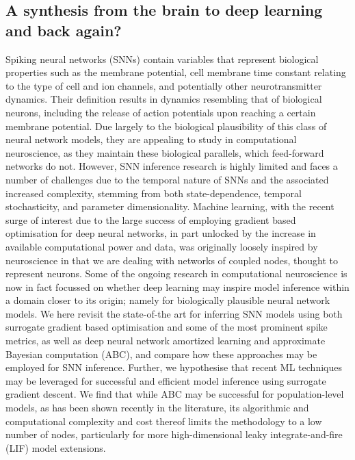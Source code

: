 \documentclass[mphil,deptreport,ai]{infthesis} %
\begin{document}

\subsection{A synthesis from the brain to deep learning and back again?}

Spiking neural networks (SNNs) contain variables that represent biological properties such as the membrane potential, cell membrane time constant relating to the type of cell and ion channels, and potentially other neurotransmitter dynamics. Their definition results in dynamics resembling that of biological neurons, including the release of action potentials upon reaching a certain membrane potential.
Due largely to the biological plausibility of this class of neural network models, they are appealing to study in computational neuroscience, as they maintain these biological parallels, which feed-forward networks  do not.
However, SNN inference research is highly limited and faces a number of challenges due to the temporal nature of SNNs and the associated increased complexity, stemming from both state-dependence, temporal stochasticity, and parameter dimensionality.
Machine learning, with the recent surge of interest due to the large success of employing gradient based optimisation for deep neural networks, in part unlocked by the increase in available computational power and data, was originally loosely inspired by neuroscience in that we are dealing with networks of coupled nodes, thought to represent neurons.
Some of the ongoing research in computational neuroscience is now in fact focussed on whether deep learning may inspire model inference within a domain closer to its origin; namely for biologically plausible neural network models.
We here revisit the state-of-the art for inferring SNN models using both surrogate gradient based optimisation and some of the most prominent spike metrics, as well as deep neural network amortized learning and approximate Bayesian computation (ABC), and compare how these approaches may be employed for SNN inference. Further, we hypothesise that recent ML techniques may be leveraged for successful and efficient model inference using surrogate gradient descent.
We find that while ABC may be successful for population-level models, as has been shown recently in the literature, its algorithmic and computational complexity and cost thereof limits the methodology to a low number of nodes, particularly for more high-dimensional leaky integrate-and-fire (LIF) model extensions.
\end{document}
